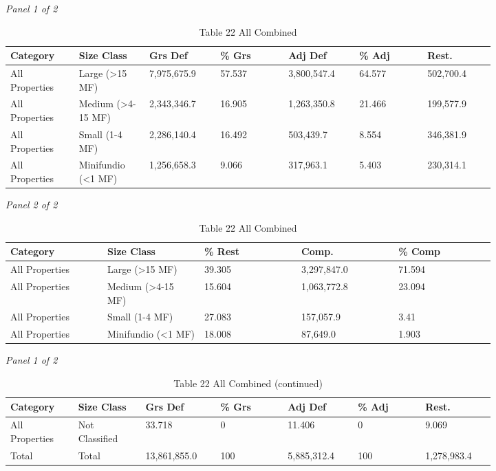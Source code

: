 \documentclass[12pt]{article}
\begin{document}
\begin{landscape}
\begin{table}[H]
\centering
\caption{Table 22 All Combined}
\textit{Panel 1 of 2}\\[2pt]
{\fontsize{12}{14}\selectfont
\setlength{\tabcolsep}{3pt}
\renewcommand{\arraystretch}{1.08}
\begin{tabular}{p{0.117\linewidth}p{0.117\linewidth}p{0.117\linewidth}p{0.117\linewidth}p{0.117\linewidth}p{0.117\linewidth}p{0.117\linewidth}}
\toprule
Category & Size Class & Grs Def & \% Grs & Adj Def & \% Adj & Rest. \\
\midrule
All Properties & Large (>15 MF) & 7,975,675.9 & 57.537 & 3,800,547.4 & 64.577 & 502,700.4 \\
All Properties & Medium (>4-15 MF) & 2,343,346.7 & 16.905 & 1,263,350.8 & 21.466 & 199,577.9 \\
All Properties & Small (1-4 MF) & 2,286,140.4 & 16.492 & 503,439.7 & 8.554 & 346,381.9 \\
All Properties & Minifundio (<1 MF) & 1,256,658.3 & 9.066 & 317,963.1 & 5.403 & 230,314.1 \\
\bottomrule
\end{tabular}
}

\vspace{0.6em}

\textit{Panel 2 of 2}\\[2pt]
{\fontsize{12}{14}\selectfont
\setlength{\tabcolsep}{3pt}
\renewcommand{\arraystretch}{1.08}
\begin{tabular}{p{0.164\linewidth}p{0.164\linewidth}p{0.164\linewidth}p{0.164\linewidth}p{0.164\linewidth}}
\toprule
Category & Size Class & \% Rest & Comp. & \% Comp \\
\midrule
All Properties & Large (>15 MF) & 39.305 & 3,297,847.0 & 71.594 \\
All Properties & Medium (>4-15 MF) & 15.604 & 1,063,772.8 & 23.094 \\
All Properties & Small (1-4 MF) & 27.083 & 157,057.9 & 3.41 \\
All Properties & Minifundio (<1 MF) & 18.008 & 87,649.0 & 1.903 \\
\bottomrule
\end{tabular}
}
\end{table}
\begin{table}[H]
\centering
\caption{Table 22 All Combined (continued)}
\textit{Panel 1 of 2}\\[2pt]
{\fontsize{12}{14}\selectfont
\setlength{\tabcolsep}{3pt}
\renewcommand{\arraystretch}{1.08}
\begin{tabular}{p{0.117\linewidth}p{0.117\linewidth}p{0.117\linewidth}p{0.117\linewidth}p{0.117\linewidth}p{0.117\linewidth}p{0.117\linewidth}}
\toprule
Category & Size Class & Grs Def & \% Grs & Adj Def & \% Adj & Rest. \\
\midrule
All Properties & Not Classified & 33.718 & 0 & 11.406 & 0 & 9.069 \\
Total & Total & 13,861,855.0 & 100 & 5,885,312.4 & 100 & 1,278,983.4 \\
\bottomrule
\end{tabular}
}


\end{table}
\end{landscape}
\end{document}

